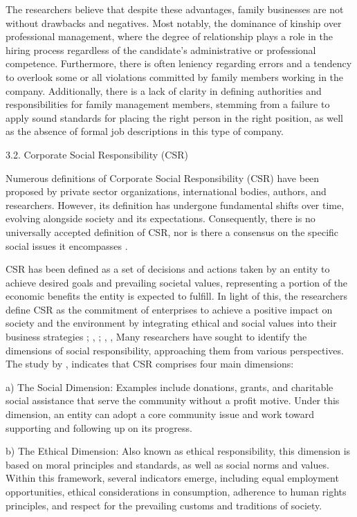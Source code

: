 \documentclass{default}
\begin{document}
The researchers believe that despite these advantages, family businesses are not without drawbacks and negatives. Most notably, the dominance of kinship over professional management, where the degree of relationship plays a role in the hiring process regardless of the candidate’s administrative or professional competence. Furthermore, there is often leniency regarding errors and a tendency to overlook some or all violations committed by family members working in the company. Additionally, there is a lack of clarity in defining authorities and responsibilities for family management members, stemming from a failure to apply sound standards for placing the right person in the right position, as well as the absence of formal job descriptions in this type of company.

3.2. Corporate Social Responsibility (CSR)

Numerous definitions of Corporate Social Responsibility (CSR) have been proposed by private sector organizations, international bodies, authors, and researchers. However, its definition has undergone fundamental shifts over time, evolving alongside society and its expectations. Consequently, there is no universally accepted definition of CSR, nor is there a consensus on the specific social issues it encompasses \cite{ref5}.

CSR has been defined as a set of decisions and actions taken by an entity to achieve desired goals and prevailing societal values, representing a portion of the economic benefits the entity is expected to fulfill. In light of this, the researchers define CSR as the commitment of enterprises to achieve a positive impact on society and the environment by integrating ethical and social values into their business strategies \cite{ref6}; \cite{ref20}, ; \cite{ref40}, \cite{ref39}, Many researchers have sought to identify the dimensions of social responsibility, approaching them from various perspectives. The study by \cite{ref25}, indicates that CSR comprises four main dimensions:

a) The Social Dimension: Examples include donations, grants, and charitable social assistance that serve the community without a profit motive. Under this dimension, an entity can adopt a core community issue and work toward supporting and following up on its progress.

b) The Ethical Dimension: Also known as ethical responsibility, this dimension is based on moral principles and standards, as well as social norms and values. Within this framework, several indicators emerge, including equal employment opportunities, ethical considerations in consumption, adherence to human rights principles, and respect for the prevailing customs and traditions of society.
\end{document}
